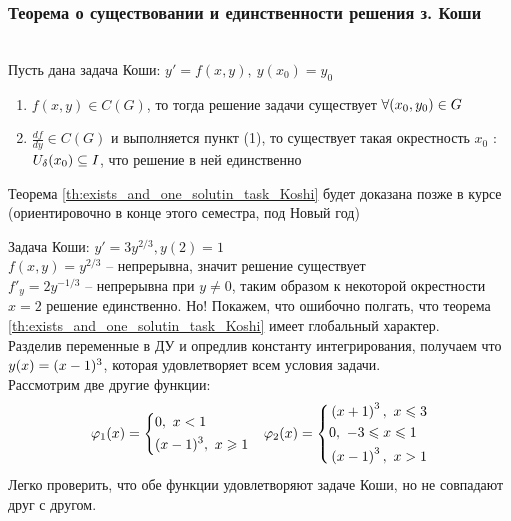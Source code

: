 \subsubsection{Теорема о существовании и единственности решения з. Коши}
\begin{theorem} \label{th:exists_and_one_solutin_task_Koshi}  \\
Пусть дана задача Коши:  $y' = f(x, y), ~ y(x_0) = y_0$ 
\begin{enumerate}
    \item $f(x, y) \in C(G)$, то тогда решение задачи существует $\forall (x_0, y_0) \in G$
    \item $\frac{df}{dy} \in C(G)$ и выполняется пункт (1), то существует такая окрестность $x_0$ : $U_{\delta}(x_0) \subseteq I$, что решение в ней единственно
\end{enumerate}
\end{theorem}
Теорема \ref{th:exists_and_one_solutin_task_Koshi} будет доказана позже в курсе (ориентировочно в конце этого семестра, под Новый год)
\begin{example}
Задача Коши: $y' = 3 y^{2/3}, y(2) = 1$\\
$f(x,y) = y^{2/3}$ -- непрерывна, значит решение существует\\
$f'_{y} = 2 y^{-1/3}$ -- непрерывна при $y \neq 0$, таким образом к некоторой окрестности $x=2$ решение единственно. Но! Покажем, что ошибочно полгать, что теорема \ref{th:exists_and_one_solutin_task_Koshi} имеет глобальный характер.\\
Разделив переменные в ДУ и опредлив константу интегрирования, получаем что $y(x) \hm{=} (x-1)^3$, которая удовлетворяет всем условия задачи.\\
Рассмотрим две другие функции:
\begin{align}
    \varphi_1(x) =  \left\{ \begin{aligned}
     &0, ~ x < 1 \\
     &(x-1)^3, ~ x \geqslant 1
    \end{aligned} \right. && \varphi_2 (x) = \left \{ \begin{aligned}
    & \left( x+1 \right)^3, ~ x \leqslant 3 \\
    & 0, ~ -3 \leqslant x \leqslant 1 \\
    & \left( x-1 \right)^3 , ~ x >1 
    \end{aligned} \right.
\end{align}
Легко проверить, что обе функции удовлетворяют задаче Коши, но не совпадают друг с другом.
\end{example}
